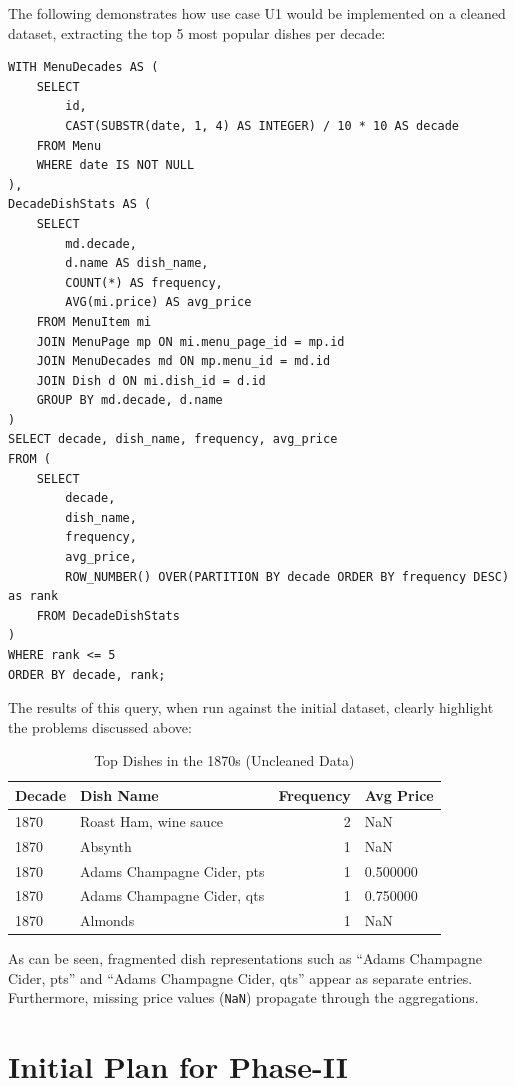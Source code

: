 \documentclass[11pt]{article}
\begin{document}
The following demonstrates how use case U1 would be implemented on a cleaned
dataset, extracting the top 5 most popular dishes per decade:

\begin{verbatim}
WITH MenuDecades AS (
    SELECT 
        id,
        CAST(SUBSTR(date, 1, 4) AS INTEGER) / 10 * 10 AS decade
    FROM Menu
    WHERE date IS NOT NULL
),
DecadeDishStats AS (
    SELECT 
        md.decade,
        d.name AS dish_name,
        COUNT(*) AS frequency,
        AVG(mi.price) AS avg_price
    FROM MenuItem mi
    JOIN MenuPage mp ON mi.menu_page_id = mp.id
    JOIN MenuDecades md ON mp.menu_id = md.id
    JOIN Dish d ON mi.dish_id = d.id
    GROUP BY md.decade, d.name
)
SELECT decade, dish_name, frequency, avg_price
FROM (
    SELECT 
        decade, 
        dish_name, 
        frequency, 
        avg_price,
        ROW_NUMBER() OVER(PARTITION BY decade ORDER BY frequency DESC) as rank
    FROM DecadeDishStats
)
WHERE rank <= 5
ORDER BY decade, rank;
\end{verbatim}

The results of this query, when run against the initial dataset, clearly highlight
the problems discussed above:

\begin{table}[htbp]
    \centering
    \begin{tabular}{l l r l}
    \hline
    \textbf{Decade} & \textbf{Dish Name} & \textbf{Frequency} & \textbf{Avg Price} \\
    \hline
    1870 & Roast Ham, wine sauce & 2 & NaN \\
    1870 & Absynth & 1 & NaN \\
    1870 & Adams Champagne Cider, pts & 1 & 0.500000 \\
    1870 & Adams Champagne Cider, qts & 1 & 0.750000 \\
    1870 & Almonds & 1 & NaN \\
    \hline
    \end{tabular}
    \caption{Top Dishes in the 1870s (Uncleaned Data)}
    \label{tab:1870_results}
\end{table}

As can be seen, fragmented dish representations such as ``Adams Champagne Cider,
pts'' and ``Adams Champagne Cider, qts'' appear as separate entries. Furthermore,
missing price values (\texttt{NaN}) propagate through the aggregations.

\section{Initial Plan for Phase-II}  %
\label{sec:phase2}
\end{document}
